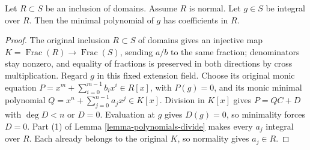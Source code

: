 \begin{lemma}
\label{lemma-minimal-polynomial-normal-domain}
Let $R \subset S$ be an inclusion of domains.
Assume $R$ is normal. Let $g \in S$ be integral
over $R$. Then the minimal polynomial of $g$
has coefficients in $R$.
\end{lemma}

\begin{proof}
The original inclusion $R\subset S$ of domains gives an
injective map $K=\operatorname{Frac}(R)\to\operatorname{Frac}(S)$,
sending $a/b$ to the same fraction; denominators stay nonzero,
and equality of fractions is preserved in both directions by
cross multiplication. Regard $g$ in this fixed extension field.
Choose its original monic equation
$P=x^m+\sum_{i=0}^{m-1}b_ix^i\in R[x]$, with $P(g)=0$,
and its monic minimal polynomial
$Q=x^n+\sum_{j=0}^{n-1}a_jx^j\in K[x]$.
Division in $K[x]$ gives $P=QC+D$ with $\deg D<n$ or $D=0$.
Evaluation at $g$ gives $D(g)=0$, so minimality forces $D=0$.
Part (1) of Lemma \ref{lemma-polynomials-divide} makes every
$a_j$ integral over $R$. Each already belongs to the original
$K$, so normality gives $a_j\in R$.
\end{proof}